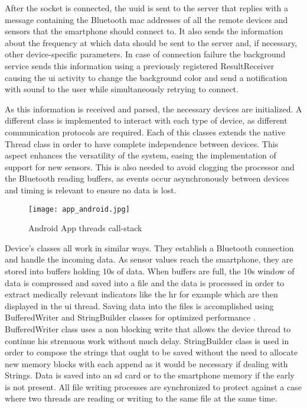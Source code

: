 After the socket is connected, the \ac{uuid} is sent to the server that replies with a message containing the Bluetooth mac addresses of all the remote devices and sensors that the smartphone should connect to. It also sends the information about the frequency at which data should be sent to the server and, if necessary, other device-specific parameters. In case of connection failure the background service sends this information using a previously registered ResultReceiver causing the \ac{ui} activity to change the background color and send a notification with sound to the user while simultaneously retrying to connect.

As this information is received and parsed, the necessary devices are initialized. A different class is implemented to interact with each type of device, as different communication protocols are required. Each of this classes extends the native Thread class in order to have complete independence between devices. This aspect enhances the versatility of the system, easing the implementation of support for new sensors. This is also needed to avoid clogging the processor and the Bluetooth reading buffers, as events occur asynchronously between devices and timing is relevant to ensure no data is lost.

\begin{figure}[!h]
	\centering
	\texttt{[image: app\_android.jpg]}
	\caption{Android App threads call-stack}
	\label{fig:app_thread}
\end{figure}

Device's classes all work in similar ways. They establish a Bluetooth connection and handle the incoming data. As sensor values reach the smartphone, they are stored into buffers holding 10s of data. When buffers are full, the 10s window of data is compressed and saved into a file and the data is processed in order to extract medically relevant indicators like the \ac{hr} for example which are then displayed in the \ac{ui} thread. Saving data into the files is accomplished using BufferedWriter and StringBuilder classes for optimized performance \cite{android}. BufferedWriter class uses a non blocking write that allows the device thread to continue his strenuous work without much delay. StringBuilder class is used in order to compose the strings that ought to be saved without the need to allocate new memory blocks with each append as it would be necessary if dealing with Strings. Data is saved into an \ac{sd} card or to the smartphone memory if the early is not present. All file writing processes are synchronized to protect against a case where two threads are reading or writing to the same file at the same time.

